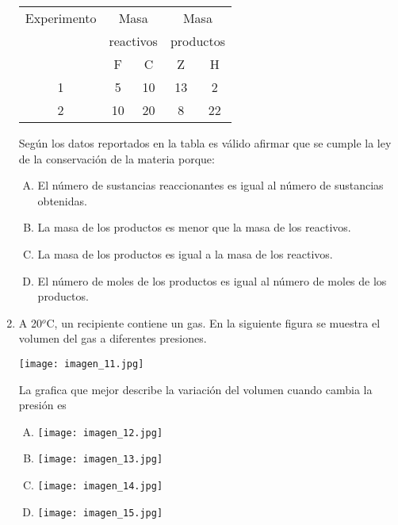 \begin{enumerate}
\begin{center}
\begin{tabular}{|ccccc|}
\hline 
Experimento & \multicolumn{2}{c}{Masa} & \multicolumn{2}{c|}{Masa}\\
 & \multicolumn{2}{c}{reactivos} & \multicolumn{2}{c|}{productos}\\ 
\hline 
 & F & C & Z & H \\ 

1 & 5 & 10 & 13 & 2 \\ 

2 & 10 & 20 & 8 & 22 \\ 
\hline 
\end{tabular}  

Según los datos reportados en la tabla es válido afirmar que se cumple la ley de la conservación de la materia porque:

\end{center}
\begin{enumerate}[(A)]
\item El número de sustancias reaccionantes es igual al número de sustancias obtenidas.
\item La masa de los productos es menor que la masa de los reactivos. 
\item La masa de los productos es igual a la masa de los reactivos.
\item El número de moles de los productos es igual al número de moles de los productos.
\end{enumerate}

\item A 20$^o$C, un recipiente contiene un gas. En la siguiente figura se muestra el volumen del gas a diferentes presiones.\label{mon-18}


\texttt{[image: imagen\_11.jpg]}

La grafica que mejor describe la variación del volumen cuando cambia la presión es



\begin{enumerate}[(A)]
\item \texttt{[image: imagen\_12.jpg]}
\item \texttt{[image: imagen\_13.jpg]}
\item \texttt{[image: imagen\_14.jpg]}
\item \texttt{[image: imagen\_15.jpg]}
\end{enumerate}



\end{enumerate}
